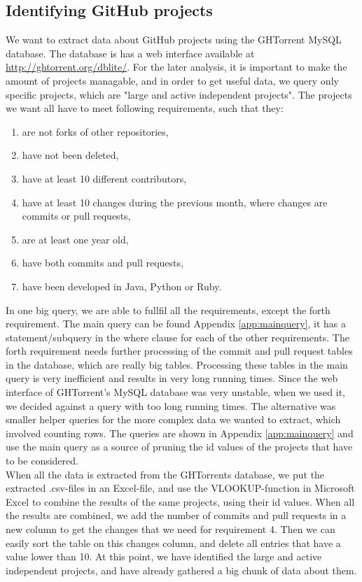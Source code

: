 \documentclass[a4paper,11pt]{article}
\begin{document}
		\subsection{Identifying GitHub projects}
			We want to extract data about GitHub projects using the GHTorrent MySQL database. The database is has a web interface available at \url{http://ghtorrent.org/dblite/}. For the later analysis, it is important to make the amount of projects managable, and in order to get useful data, we query only specific projects, which are "large and active independent projects". The projects we want all have to meet following requirements, such that they:

			\begin{enumerate}
				\item are not forks of other repositories,
				\item have not been deleted,
				\item have at least 10 different contributors,
				\item have at least 10 changes during the previous month, where changes are commits or pull requests,
				\item are at least one year old,
				\item have both commits and pull requests,
				\item have been developed in Java, Python or Ruby.
			\end{enumerate}
	
			In one big query, we are able to fullfil all the requirements, except the forth requirement. The main query can be found Appendix \ref{app:mainquery}, it has a statement/subquery in the where clause for each of the other requirements. The forth requirement needs further processing of the commit and pull request tables in the database, which are really big tables. Processing these tables in the main query is very inefficient and results in very long running times. Since the web interface of GHTorrent's MySQL database was very unstable, when we used it, we decided against a query with too long running times. The alternative was smaller helper queries for the more complex data we wanted to extract, which involved counting rows. The queries are shown in Appendix \ref{app:mainquery} and use the main query as a source of pruning the id values of the projects that have to be considered.\\

			When all the data is extracted from the GHTorrents database, we put the extracted .csv-files in an Excel-file, and use the VLOOKUP-function in Microsoft Excel to combine the results of the same projects, using their id values. When all the results are combined, we add the number of commits and pull requests in a new column to get the changes that we need for requirement 4. Then we can easily sort the table on this changes column, and delete all entries that have a value lower than 10. At this point, we have identified the large and active independent projects, and have already gathered a big chunk of data about them.
\end{document}
